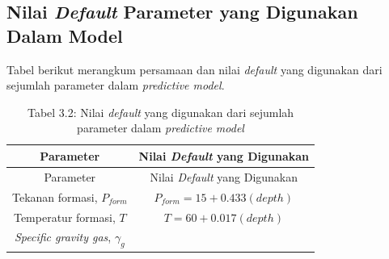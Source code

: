 \documentclass[
]{book}
\begin{document}
\hypertarget{nilai-default-parameter-yang-digunakan-dalam-model}{%
\subsection{\texorpdfstring{Nilai \emph{Default} Parameter yang Digunakan Dalam Model}{Nilai Default Parameter yang Digunakan Dalam Model}}\label{nilai-default-parameter-yang-digunakan-dalam-model}}

Tabel berikut merangkum persamaan dan nilai \emph{default} yang digunakan dari sejumlah parameter dalam \emph{predictive model}.

\begin{longtable}[]{@{}cc@{}}
\caption{{ Tabel 3.2: Nilai \emph{default} yang digunakan dari sejumlah parameter dalam \emph{predictive model} }}\tabularnewline
\toprule
\begin{minipage}[b]{0.47\columnwidth}\centering
Parameter\strut
\end{minipage} & \begin{minipage}[b]{0.47\columnwidth}\centering
Nilai \emph{Default} yang Digunakan\strut
\end{minipage}\tabularnewline
\midrule
\endfirsthead
\toprule
\begin{minipage}[b]{0.47\columnwidth}\centering
Parameter\strut
\end{minipage} & \begin{minipage}[b]{0.47\columnwidth}\centering
Nilai \emph{Default} yang Digunakan\strut
\end{minipage}\tabularnewline
\midrule
\endhead
\begin{minipage}[t]{0.47\columnwidth}\centering
Tekanan formasi, \(P_{form}\)\strut
\end{minipage} & \begin{minipage}[t]{0.47\columnwidth}\centering
\(P_{form}=15+0.433 (depth)\)\strut
\end{minipage}\tabularnewline
\begin{minipage}[t]{0.47\columnwidth}\centering
Temperatur formasi, \(T\)\strut
\end{minipage} & \begin{minipage}[t]{0.47\columnwidth}\centering
\(T=60+0.017(depth)\)\strut
\end{minipage}\tabularnewline
\begin{minipage}[t]{0.47\columnwidth}\centering
\emph{Specific gravity gas}, \(\gamma_g\)\strut
\end{minipage} & \begin{minipage}[t]{0.47\columnwidth}\centering

\end{minipage}
\end{longtable}
\end{document}
